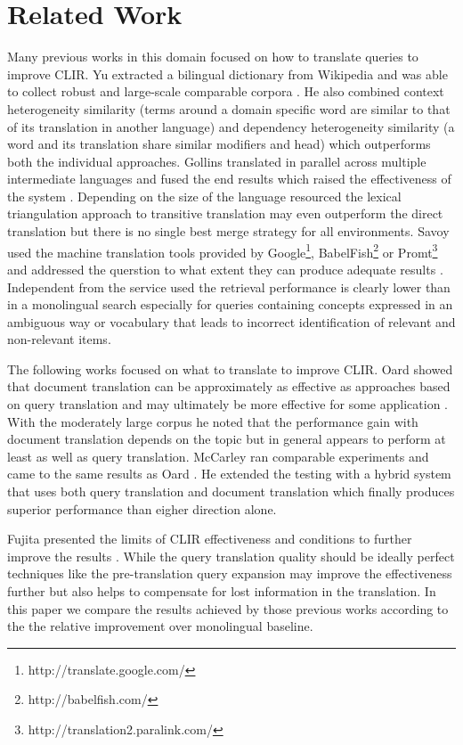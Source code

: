 \documentclass[journal]{IEEEtran}
\begin{document}
\section{Related Work}
Many previous works in this domain focused on how to translate queries to improve CLIR.
Yu extracted a bilingual dictionary from Wikipedia and was able to collect robust and large-scale comparable corpora \cite{yu09}.
He also combined context heterogeneity similarity (terms around a domain specific word are similar to that of its translation in another language) and dependency heterogeneity similarity (a word and its translation share similar modifiers and head) which outperforms both the individual approaches.
Gollins translated in parallel across multiple intermediate languages and fused the end results which raised the effectiveness of the system \cite{gollins01}.
Depending on the size of the language resourced the lexical triangulation approach to transitive translation may even outperform the direct translation but there is no single best merge strategy for all environments.
Savoy used the machine translation tools provided by Google\footnote{http://translate.google.com/}, BabelFish\footnote{http://babelfish.com/} or Promt\footnote{http://translation2.paralink.com/} and addressed the querstion to what extent they can produce adequate results \cite{savoy09}.
Independent from the service used the retrieval performance is clearly lower than in a monolingual search especially for queries containing concepts expressed in an ambiguous way or vocabulary that leads to incorrect identification of relevant and non-relevant items.

The following works focused on what to translate to improve CLIR.
Oard showed that document translation can be approximately as effective as approaches based on query translation and may ultimately be more effective for some application \cite{oard97b}.
With the moderately large corpus he noted that the performance gain with document translation depends on the topic but in general appears to perform at least as well as query translation.
McCarley ran comparable experiments and came to the same results as Oard \cite{mccarley99}.
He extended the testing with a hybrid system that uses both query translation and document translation which finally produces superior performance than eigher direction alone.

Fujita presented the limits of CLIR effectiveness and conditions to further improve the results \cite{fujita01}.
While the query translation quality should be ideally perfect techniques like the pre-translation query expansion may improve the effectiveness further but also helps to compensate for lost information in the translation.
In this paper we compare the results achieved by those previous works according to the the relative improvement over monolingual baseline.
\end{document}
